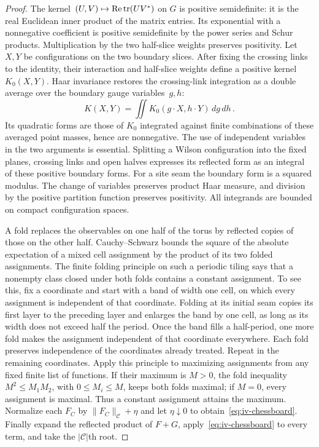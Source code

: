 \begin{proof}
The kernel~$(U,V)\mapsto\operatorname{Re}\operatorname{tr}(UV^*)$ on $G$ is positive semidefinite: it is the real Euclidean inner product of the matrix entries.
Its exponential with a nonnegative coefficient is positive semidefinite by the power series and Schur products.
Multiplication by the two half-slice weights preserves positivity.
Let~$X,Y$ be configurations on the two boundary slices.
After fixing the crossing links to the identity, their interaction and half-slice weights define a positive kernel~$K_0(X,Y)$.
Haar invariance restores the crossing-link integration as a double average over the boundary gauge variables~$g,h$:
\begin{equation*}
K(X,Y)=\iint K_0(g\cdot X,h\cdot Y)\,dg\,dh\,.
\end{equation*}
Its quadratic forms are those of $K_0$ integrated against finite combinations of these averaged point masses, hence are nonnegative.
The use of independent variables in the two arguments is essential.
Splitting a Wilson configuration into the fixed planes, crossing links and open halves expresses its reflected form as an integral of these positive boundary forms.
For a site seam the boundary form is a squared modulus.
The change of variables preserves product Haar measure, and division by the positive partition function preserves positivity.
All integrands are bounded on compact configuration spaces.

A fold replaces the observables on one half of the torus by reflected copies of those on the other half.
Cauchy--Schwarz bounds the square of the absolute expectation of a mixed cell assignment by the product of its two folded assignments.
The finite folding principle on such a periodic tiling says that a nonempty class closed under both folds contains a constant assignment.
To see this, fix a coordinate and start with a band of width one cell, on which every assignment is independent of that coordinate.
Folding at its initial seam copies its first layer to the preceding layer and enlarges the band by one cell, as long as its width does not exceed half the period.
Once the band fills a half-period, one more fold makes the assignment independent of that coordinate everywhere.
Each fold preserves independence of the coordinates already treated.
Repeat in the remaining coordinates.
Apply this principle to maximizing assignments from any fixed finite list of functions.
If their maximum is $M>0$, the fold inequality $M^2\le M_1M_2$, with $0\le M_i\le M$, keeps both folds maximal; if $M=0$, every assignment is maximal.
Thus a constant assignment attains the maximum.
Normalize each $F_C$ by $\|F_C\|_{\mathcal C}+\eta$ and let $\eta\downarrow0$ to obtain~\eqref{eq:iv-chessboard}.
Finally expand the reflected product of $F+G$, apply~\eqref{eq:iv-chessboard} to every term, and take the $|\mathcal C|$th root.
\end{proof}

